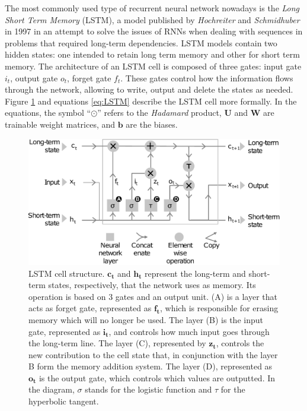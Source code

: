 The most commonly used type of recurrent neural network nowadays is the \textit{Long Short Term Memory} (LSTM), a model published by  \textit{Hochreiter} and \textit{Schmidhuber} in 1997 \autocite{Schmidhuber1997} in an attempt to solve the issues of RNNs when dealing with sequences in problems that required long-term dependencies. LSTM models contain two hidden states: one intended to retain long term memory and other for short term memory. The architecture of an LSTM cell is composed of three gates: input gate $i_t$, output gate $o_t$, forget gate $f_t$. These gates control how the information flows through the network, allowing to write, output and delete the states as needed. Figure \ref{fig:lstm} and equations \ref{eq:LSTM} describe the LSTM cell more formally. In the equations, the symbol ``$\odot$'' refers to the \textit{Hadamard} product, $\mathbf{U}$ and $\mathbf{W}$ are trainable weight matrices, and $\mathbf{b}$ are the biases.

\begin{figure}
	\centering
	\includegraphics[width=0.7\linewidth]{chapter2/images/LSTM}
	\caption{LSTM cell structure. $\mathbf{c_t}$ and $\mathbf{h_t}$ represent the long-term and short-term states, respectively, that the network uses as memory. Its operation is based on 3 gates and an output unit. (A) is a layer that acts as forget gate, represented as $\mathbf{f_t}$, which is responsible for erasing memory which will no longer be used. The layer (B) is the input gate, represented as $\mathbf{i_t}$, and controls how much input goes through the long-term line. The layer (C), represented by $\mathbf{z_t}$, controls the new contribution to the cell state that, in conjunction with the layer B form the memory addition system. The layer (D), represented as $\mathbf{o_t}$ is the output gate, which controls which values are outputted. In the diagram, $\sigma$ stands for the logistic function and $\tau$ for the hyperbolic tangent.}
	\label{fig:lstm}
\end{figure}




